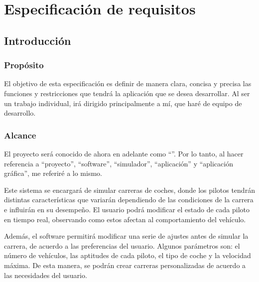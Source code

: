 


\chapter{Especificación de requisitos}

\section{Introducción}

\subsection{Propósito}
El objetivo de esta especificación es definir de manera clara, concisa y precisa las funciones y restricciones que tendrá la aplicación que se desea desarrollar. Al ser un trabajo individual, irá dirigido principalmente a mí, que haré de equipo de desarrollo.

\subsection{Alcance}
El proyecto será conocido de ahora en adelante como ``\myTitle''. Por lo tanto, al hacer referencia a ``proyecto'', ``software'', ``simulador'', ``aplicación'' y ``aplicación gráfica'', me referiré a lo mismo.

\bigskip

Este sistema se encargará de simular carreras de coches, donde los pilotos tendrán distintas características que variarán dependiendo de las condiciones de la carrera e influirán en su desempeño. El usuario podrá modificar el estado de cada piloto en tiempo real, observando como estos afectan al comportamiento del vehículo.

\bigskip

Además, el software permitirá modificar una serie de ajustes antes de simular la carrera, de acuerdo a las preferencias del usuario. Algunos parámetros son: el número de vehículos, las aptitudes de cada piloto, el tipo de coche y la velocidad máxima. De esta manera, se podrán crear carreras personalizadas de acuerdo a las necesidades del usuario.

